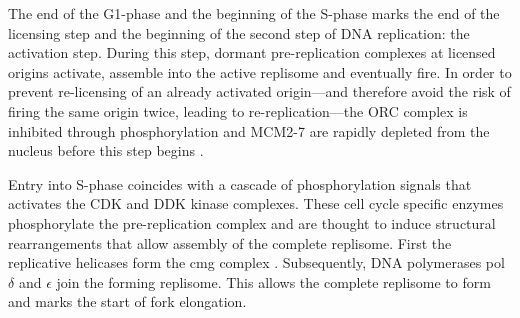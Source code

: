 The end of the G1-phase and the beginning of the S-phase marks the end of the licensing step and the beginning of the second step of DNA replication: the activation step. 
During this step, dormant pre-replication complexes at licensed origins activate, assemble into the active replisome and eventually fire. 
In order to prevent re-licensing of an already activated origin—and therefore avoid the risk of firing the same origin twice, leading to re-replication—the ORC complex is  inhibited through phosphorylation and MCM2-7 are rapidly depleted from the nucleus before this step begins \cite{nguyen:2001:cyclindependent}. 


Entry into S-phase coincides with a cascade of phosphorylation signals that activates the CDK and DDK kinase complexes. 
These cell cycle specific enzymes phosphorylate the pre-replication complex and are thought to induce structural rearrangements that allow assembly of the complete replisome. 
First the replicative helicases form the \gls{cmg} complex \cite{moyer:2006:isolation, aparicio:2009:human}. 
Subsequently, DNA polymerases pol $\delta$ and $\epsilon$ join the forming replisome. 
This allows the complete replisome to form and marks the start of fork elongation.













